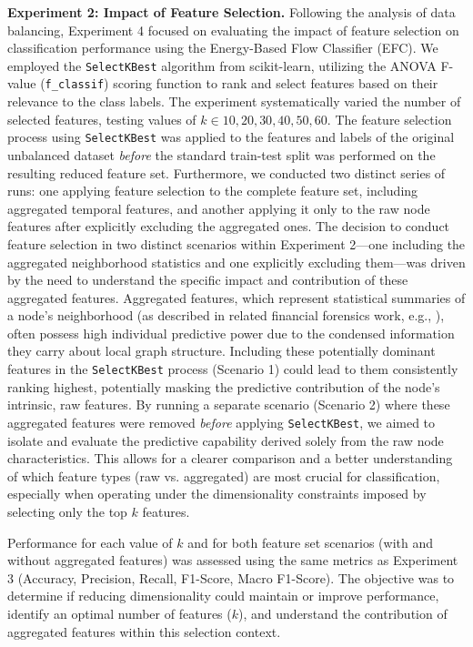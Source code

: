 \documentclass[12pt]{article}
\begin{document}
\textbf{Experiment 2: Impact of Feature Selection.} Following the analysis of data balancing, Experiment 4 focused on evaluating 
the impact of feature selection on classification performance using the Energy-Based Flow Classifier (EFC). We employed
the \texttt{SelectKBest} algorithm from scikit-learn, utilizing the ANOVA F-value (\texttt{f\_classif}) scoring function
to rank and select features based on their relevance to the class labels. The experiment systematically varied the number
of selected features, testing values of $k \in {10, 20, 30, 40, 50, 60}$. The feature selection process using \texttt{SelectKBest}
was applied to the features and labels of the original unbalanced dataset \textit{before} the standard train-test split
was performed on the resulting reduced feature set. Furthermore, we conducted two distinct series of runs: one applying
feature selection to the complete feature set, including aggregated temporal features, and another applying it only to
the raw node features after explicitly excluding the aggregated ones. The decision to conduct feature selection in two
distinct scenarios within Experiment 2---one including the aggregated neighborhood statistics and one explicitly excluding
them---was driven by the need to understand the specific impact and contribution of these aggregated features. Aggregated
features, which represent statistical summaries of a node's neighborhood (as described in related financial forensics
work, e.g., \cite{weber2019antimoneylaunderingbitcoinexperimenting}), often possess high individual predictive power due
to the condensed information they carry about local graph structure. Including these potentially dominant features in the
\texttt{SelectKBest} process (Scenario 1) could lead to them consistently ranking highest, potentially masking the predictive
contribution of the node's intrinsic, raw features. By running a separate scenario (Scenario 2) where these aggregated
features were removed \textit{before} applying \texttt{SelectKBest}, we aimed to isolate and evaluate the predictive
capability derived solely from the raw node characteristics. This allows for a clearer comparison and a better understanding
of which feature types (raw vs. aggregated) are most crucial for classification, especially when operating under the
dimensionality constraints imposed by selecting only the top $k$ features.

Performance for each value of $k$ and for both feature set scenarios (with and without aggregated features) was assessed
using the same metrics as Experiment 3 (Accuracy, Precision, Recall, F1-Score, Macro F1-Score). The objective was to
determine if reducing dimensionality could maintain or improve performance, identify an optimal number of features ($k$),
and understand the contribution of aggregated features within this selection context.
\end{document}
